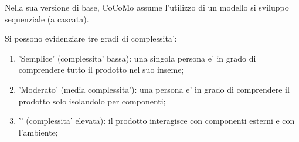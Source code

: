 Nella sua versione di base, CoCoMo assume l'utilizzo di un modello si sviluppo sequenziale (a cascata). 

Si possono evidenziare tre gradi di complessita':
\begin{enumerate}
	\item 'Semplice' (complessita' bassa): una singola persona e' in grado di comprendere tutto il prodotto nel suo inseme;
	\item 'Moderato' (media complessita'): una persona e' in grado di comprendere il prodotto solo isolandolo per componenti;
	\item '' (complessita' elevata): il prodotto interagisce con componenti esterni e con l'ambiente;
\end{enumerate}


